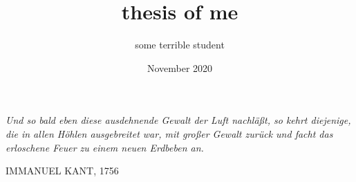 \documentclass{report}
\title{thesis of me}
\author{some terrible student}
\date{November 2020}
\begin{document}
\maketitle

\null\vfill

\begin{center}
	\parbox{\linewidth}{%
		\raggedright{\itshape%
			Und so bald eben diese ausdehnende Gewalt der Luft nachl\"aßt, so kehrt diejenige, die in allen H\"ohlen ausgebreitet  war, mit großer Gewalt zur\"uck und facht das erloschene Feuer zu einem neuen Erdbeben an.\par\bigskip
		}   
		\raggedleft\MakeUppercase{Immanuel Kant, 1756\cite{Kant}}\par%
	}
\end{center}


\vfill\vfill

\tableofcontents












\end{document}
